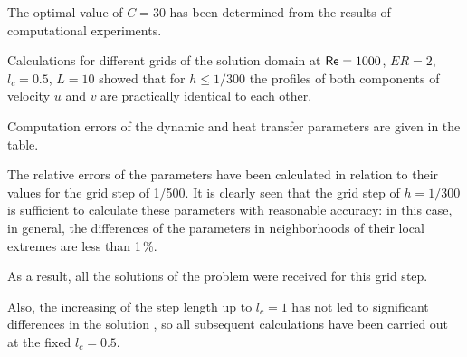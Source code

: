 The optimal value of $C = 30$ has been determined from the results of computational experiments.






\smallskip




Calculations for different grids of the solution domain at ${\sf Re}=1000$, $ER=2$, $l_c=0.5$, $L=10$ showed that for $h \leqslant 1/300$ the profiles of both components of velocity $u$ and $v$ are practically identical to each other. 

Computation errors of the dynamic and heat transfer parameters are given in the table. 

The relative errors of the parameters have been calculated in relation to their values for the grid step of 1/500. It is clearly seen that the grid step of $h = 1/300$ is sufficient to calculate these parameters with reasonable accuracy: in this case, in general, the differences of the parameters in neighborhoods of their local extremes are less than 1\,\%. 

As a result, all the solutions of the problem were received for this grid step.  

Also, the increasing of the step length up to $l_c = 1$ has not led to significant differences in the solution \cite{Fomin2016}, so all subsequent calculations have been carried out at the fixed $l_c = 0.5$.



